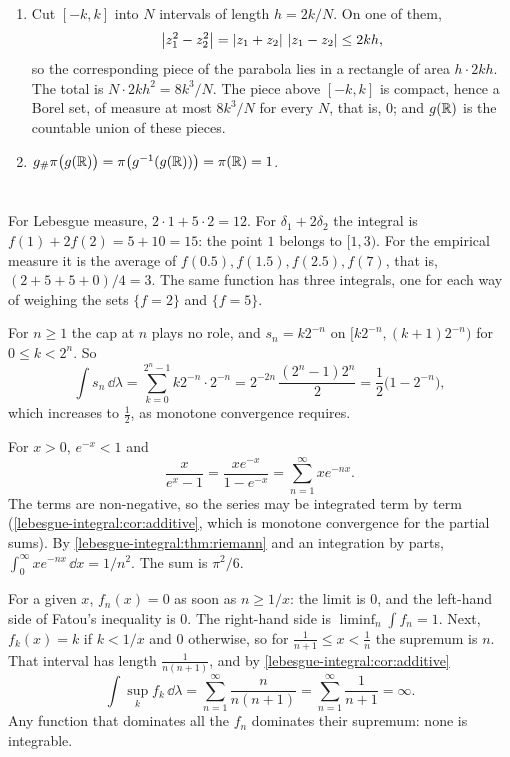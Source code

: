 \begin{enumerate}[nosep]
  \item Cut $[-k, k]$ into $N$ intervals of length $h = 2k/N$. On one
        of them,
        \[
          \left|z_1^2 - z_2^2\right| = \left|z_1 + z_2\right|\,\left|z_1 - z_2\right|\leq2kh ,
        \]
        so the corresponding piece of the parabola lies in a rectangle
        of area $h\cdot2kh$. The total is
        $N\cdot2kh^2 = 8k^3/N$. The piece above $[-k, k]$ is compact,
        hence a Borel set, of measure at most $8k^3/N$ for every $N$,
        that is, $0$; and $g(\mathbb{R})$ is the countable union of these
        pieces.
  \item $g_\#\pi\bigl(g(\mathbb{R})\bigr) = \pi\bigl(g^{-1}(g(\mathbb{R}))\bigr)
        = \pi(\mathbb{R}) = 1$.
\end{enumerate}

\section{}

For Lebesgue measure, $2\cdot1 + 5\cdot2 = 12$. For
$\delta_1 + 2\delta_2$ the integral is $f(1) + 2f(2) = 5 + 10 = 15$:
the point $1$ belongs to $[1, 3)$. For the empirical measure it is the
average of $f(0.5), f(1.5), f(2.5), f(7)$, that is,
$(2 + 5 + 5 + 0)/4 = 3$. The same function has three integrals, one for
each way of weighing the sets $\{f = 2\}$ and $\{f = 5\}$.

For $n\geq1$ the cap at $n$ plays no role, and $s_n = k2^{-n}$ on
$[k2^{-n}, (k + 1)2^{-n})$ for $0\leq k < 2^n$. So
\[
  \int s_n\,\dd\lambda = \sum_{k=0}^{2^n - 1}k2^{-n}\cdot2^{-n}
  = 2^{-2n}\,\frac{(2^n - 1)2^n}2 = \frac12\bigl(1 - 2^{-n}\bigr) ,
\]
which increases to $\frac12$, as monotone convergence requires.

For $x > 0$, $e^{-x} < 1$ and
\[
  \frac x{e^x - 1} = \frac{xe^{-x}}{1 - e^{-x}}
  = \sum_{n=1}^\infty xe^{-nx} .
\]
The terms are non-negative, so the series may be integrated term by
term (\cref{lebesgue-integral:cor:additive}, which is monotone
convergence for the partial sums). By
\cref{lebesgue-integral:thm:riemann} and an integration by parts,
$\int_0^\infty xe^{-nx}\,\dd x = 1/n^2$. The sum is $\pi^2/6$.

For a given $x$, $f_n(x) = 0$ as soon as $n\geq1/x$: the limit is $0$,
and the left-hand side of Fatou's inequality is $0$. The right-hand
side is $\liminf_n\int f_n = 1$. Next, $f_k(x) = k$ if $k < 1/x$ and $0$
otherwise, so for $\frac1{n+1}\leq x < \frac1n$ the supremum is $n$.
That interval has length $\frac1{n(n+1)}$, and by
\cref{lebesgue-integral:cor:additive}
\[
  \int\sup_kf_k\,\dd\lambda = \sum_{n=1}^\infty\frac n{n(n+1)}
  = \sum_{n=1}^\infty\frac1{n+1} = \infty .
\]
Any function that dominates all the $f_n$ dominates their supremum: none
is integrable.

